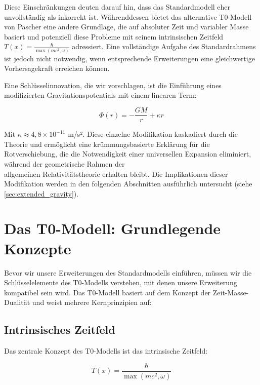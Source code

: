 \documentclass[12pt,a4paper]{article}
\newcommand{\Tfield}{T(x)}
\begin{document}
	Diese Einschränkungen deuten darauf hin, dass das Standardmodell eher unvollständig als inkorrekt ist. Währenddessen bietet das alternative T0-Modell von Pascher eine andere Grundlage, die auf absoluter Zeit und variabler Masse basiert\cite{pascher_zeit_2025} und potenziell diese Probleme mit seinem intrinsischen Zeitfeld $\Tfield = \frac{\hbar}{\max(mc^2, \omega)}$ adressiert\cite{pascher_lagrange_2025}. Eine vollständige Aufgabe des Standardrahmens ist jedoch nicht notwendig, wenn entsprechende Erweiterungen eine gleichwertige Vorhersagekraft erreichen können.
	
	Eine Schlüsselinnovation, die wir vorschlagen, ist die Einführung eines modifizierten Gravitationspotentials mit einem linearen Term:
	
	\begin{equation}
		\label{eq:modified_potential}
		\Phi(r) = -\frac{GM}{r} + \kappa r
	\end{equation}
	
	Mit $\kappa \approx 4,8\times10^{-11}$ m/s²\cite{pascher_params_2025}. Diese einzelne Modifikation kaskadiert durch die Theorie und ermöglicht eine krümmungsbasierte Erklärung für die Rotverschiebung, die die Notwendigkeit einer universellen Expansion eliminiert, während der geometrische Rahmen der \\allgemeinen Relativitätstheorie erhalten bleibt. Die Implikationen dieser Modifikation werden in den folgenden Abschnitten ausführlich untersucht (siehe \cref{sec:extended_gravity}).
	
	\section{Das T0-Modell: Grundlegende Konzepte}
	\label{sec:t0_model_fundamentals}
	
	Bevor wir unsere Erweiterungen des Standardmodells einführen, müssen wir die Schlüsselelemente des T0-Modells verstehen, mit denen unsere Erweiterung kompatibel sein wird. Das T0-Modell basiert auf dem Konzept der Zeit-Masse-Dualität\cite{pascher_zeit_masse_2025} und weist mehrere Kernprinzipien auf:
	
	\subsection{Intrinsisches Zeitfeld}
	\label{subsec:intrinsic_time}
	
	Das zentrale Konzept des T0-Modells ist das intrinsische Zeitfeld:
	
	\begin{equation}
		\label{eq:intrinsic_time}
		\Tfield = \frac{\hbar}{\max(mc^2, \omega)}
	\end{equation}
	
\end{document}
